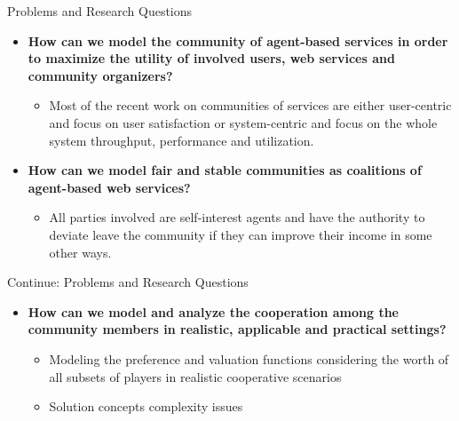 \documentclass{beamer}
\begin{document}
\begin{frame}{Problems and Research Questions}

\begin{itemize}
    \item \textbf{How can we model the
        community of agent-based services in order to maximize the utility
        of involved users, web services and community organizers?}
        \begin{itemize}
            \item Most of the recent work on communities of
            services are either user-centric and focus on user satisfaction
            or system-centric and focus on the whole system throughput, performance and utilization.
        \end{itemize}


    \item \textbf{How can we model fair and stable communities as coalitions
        of agent-based web services?}
        \begin{itemize}
            \item All parties involved are self-interest agents and have the authority to deviate leave the community if they can improve their income in some other ways.
        \end{itemize}

\end{itemize}

\end{frame}

\begin{frame}{Continue: Problems and Research Questions}
 \begin{itemize}
   \item \textbf{How can we model and analyze the cooperation
        among the community members in realistic, applicable and practical
        settings?}
        \begin{itemize}
            \item Modeling the preference and valuation functions considering the worth of all subsets of players in realistic cooperative scenarios
            \item Solution concepts complexity issues
        \end{itemize}

\end{itemize}
\end{frame}
\end{document}

